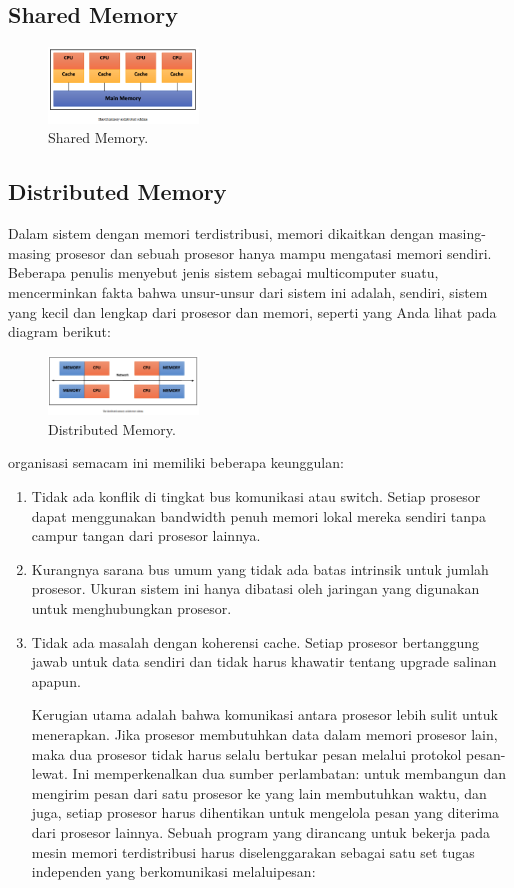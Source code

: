 \subsection{Shared Memory}

\begin{figure}[H]
	\includegraphics[width=4cm]{figures/kelompok2/chapter1/7.png}
	\centering
	\caption{Shared Memory.}
\end{figure}

\subsection{Distributed Memory}
 Dalam sistem dengan memori terdistribusi, memori dikaitkan dengan masing-masing prosesor dan sebuah prosesor hanya mampu mengatasi memori sendiri. Beberapa penulis menyebut jenis sistem sebagai multicomputer suatu, mencerminkan fakta bahwa unsur-unsur dari sistem ini adalah, sendiri, sistem yang kecil dan lengkap dari prosesor dan memori, seperti yang Anda lihat pada diagram berikut:
\begin{figure}[H]
	\includegraphics[width=4cm]{figures/kelompok2/chapter1/8.png}
	\centering
	\caption{Distributed Memory.}
\end{figure}
\noindent
organisasi semacam ini memiliki beberapa keunggulan:

\begin{enumerate}
	\item Tidak ada konflik di tingkat bus komunikasi atau switch. Setiap prosesor dapat menggunakan bandwidth penuh memori lokal mereka sendiri tanpa campur tangan dari prosesor lainnya.
	\item Kurangnya sarana bus umum yang tidak ada batas intrinsik untuk jumlah prosesor. Ukuran sistem ini hanya dibatasi oleh jaringan yang digunakan untuk menghubungkan prosesor.
	\item Tidak ada masalah dengan koherensi cache. Setiap prosesor bertanggung jawab untuk data sendiri dan tidak harus khawatir tentang upgrade salinan apapun.

Kerugian utama adalah bahwa komunikasi antara prosesor lebih sulit untuk menerapkan. Jika prosesor membutuhkan data dalam memori prosesor lain, maka dua prosesor tidak harus selalu bertukar pesan melalui protokol pesan-lewat. Ini memperkenalkan dua sumber perlambatan: untuk membangun dan mengirim pesan dari satu prosesor ke yang lain membutuhkan waktu, dan juga, setiap prosesor harus dihentikan untuk mengelola pesan yang diterima dari prosesor lainnya. Sebuah program yang dirancang untuk bekerja pada mesin memori terdistribusi harus diselenggarakan sebagai satu set tugas independen yang berkomunikasi melaluipesan:
\end{enumerate}

